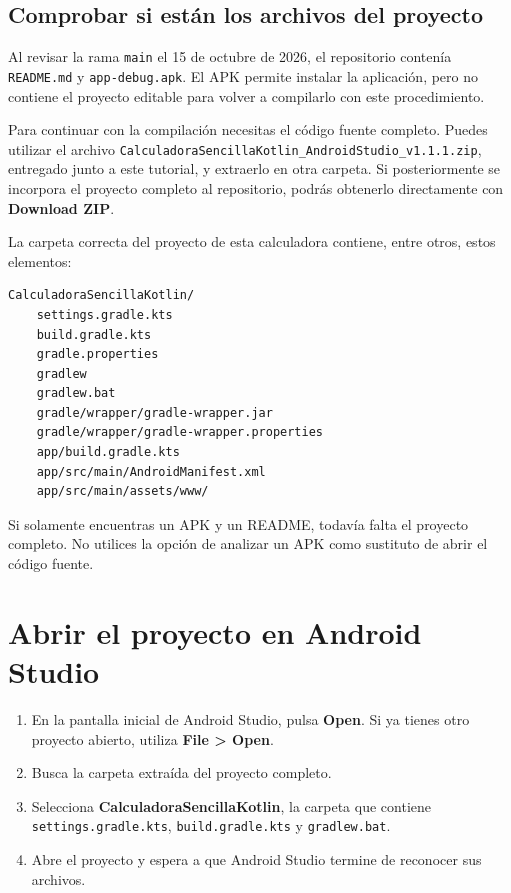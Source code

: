 \documentclass[12pt,a4paper]{article}
\begin{document}
\subsection{Comprobar si están los archivos del proyecto}

Al revisar la rama \texttt{main} el 15 de octubre de 2026, el repositorio contenía \texttt{README.md} y \texttt{app-debug.apk}. El APK permite instalar la aplicación, pero no contiene el proyecto editable para volver a compilarlo con este procedimiento.

Para continuar con la compilación necesitas el código fuente completo. Puedes utilizar el archivo \texttt{CalculadoraSencillaKotlin\_AndroidStudio\_v1.1.1.zip}, entregado junto a este tutorial, y extraerlo en otra carpeta. Si posteriormente se incorpora el proyecto completo al repositorio, podrás obtenerlo directamente con \textbf{Download ZIP}.

La carpeta correcta del proyecto de esta calculadora contiene, entre otros, estos elementos:

\begin{verbatim}
CalculadoraSencillaKotlin/
    settings.gradle.kts
    build.gradle.kts
    gradle.properties
    gradlew
    gradlew.bat
    gradle/wrapper/gradle-wrapper.jar
    gradle/wrapper/gradle-wrapper.properties
    app/build.gradle.kts
    app/src/main/AndroidManifest.xml
    app/src/main/assets/www/
\end{verbatim}

Si solamente encuentras un APK y un README, todavía falta el proyecto completo. No utilices la opción de analizar un APK como sustituto de abrir el código fuente.

\section{Abrir el proyecto en Android Studio}

\begin{enumerate}
    \item En la pantalla inicial de Android Studio, pulsa \textbf{Open}. Si ya tienes otro proyecto abierto, utiliza \textbf{File > Open}.
    \item Busca la carpeta extraída del proyecto completo.
    \item Selecciona \textbf{CalculadoraSencillaKotlin}, la carpeta que contiene \texttt{settings.gradle.kts}, \texttt{build.gradle.kts} y \texttt{gradlew.bat}.
    \item Abre el proyecto y espera a que Android Studio termine de reconocer sus archivos.
\end{enumerate}
\end{document}
